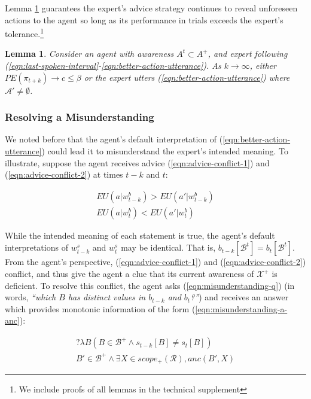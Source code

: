 \documentclass{article}
\newtheorem{lemma}{Lemma}
\begin{document}
	Lemma \ref{thm:action-awareness} guarantees the expert's advice strategy continues to reveal unforeseen actions to the agent so long as its performance in trials exceeds the expert's tolerance.\footnote{We include proofs of all lemmas in the technical supplement}
	
	\begin{lemma}
		\label{thm:action-awareness}
		Consider an agent with awareness $A^t \subset A^+$, and expert following (\ref{eqn:last-spoken-interval}-\ref{eqn:better-action-utterance}). As $k \rightarrow \infty$, either $PE(\pi_{t+k}) \rightarrow c \leq \beta$ or the expert utters (\ref{eqn:better-action-utterance}) where $\mathcal{A}' \neq \emptyset$.
	\end{lemma}	
	
	\subsubsection{Resolving a Misunderstanding}
	
		We noted before that the agent's default interpretation of (\ref{eqn:better-action-utterance}) could lead it to misunderstand the expert's intended meaning. To illustrate, suppose the agent receives advice (\ref{eqn:advice-conflict-1}) and (\ref{eqn:advice-conflict-2}) at times $t -k$ and $t$:
		
		\begin{gather}
		\label{eqn:advice-conflict-1}
		EU(a | w^b_{t - k}) > EU(a' | w^b_{t-k}) \\
		\label{eqn:advice-conflict-2}
		EU(a | w^b_{t}) < EU(a' | w^b_{t})
		\end{gather}
		
		While the intended meaning of each statement is true, the agent's default interpretations of $w^s_{t-k}$ and $w^s_{t}$ may be identical. That is, $b_{t-k}[\mathcal{B}^t] = b_{t}[\mathcal{B}^t]$. From the agent's perspective, (\ref{eqn:advice-conflict-1}) and (\ref{eqn:advice-conflict-2}) conflict, and thus give the agent a clue that its current awareness of $\mathcal{X}^+$ is deficient. To resolve this conflict, the agent asks (\ref{eqn:misunderstanding-q}) (in words, \emph{``which $B$ has distinct values in $b_{t-k}$ and $b_t$?''}) and receives an answer which provides monotonic information of the form (\ref{eqn:misunderstanding-a-anc}):
		
		\begin{gather}
		\label{eqn:misunderstanding-q}
		?\lambda B(B\in \mathcal{B}^+ \wedge s_{t - k}[B] \neq s_{t}[B]) \\
		\label{eqn:misunderstanding-a-anc}
		B' \in \mathcal{B}^+ \wedge \exists X \in scope_+(\mathcal{R}), anc(B', X)
		\end{gather}
		
\end{document}

